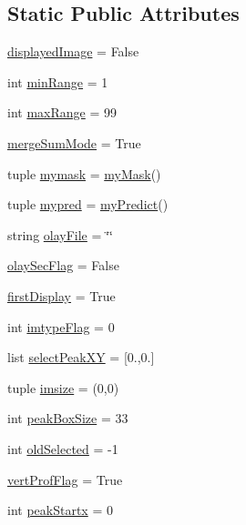 \subsection*{Static Public Attributes}
\begin{DoxyCompactItemize}
\item 
\hyperlink{class_atrex_1_1_atrex_adb81a9472392a89ed733d7d0779e45b7}{displayed\-Image} = False
\item 
int \hyperlink{class_atrex_1_1_atrex_ae832c8b0566a3106d3021b88ea739683}{min\-Range} = 1
\item 
int \hyperlink{class_atrex_1_1_atrex_ad050fe0947cfc2aaed121ca1f306d637}{max\-Range} = 99
\item 
\hyperlink{class_atrex_1_1_atrex_a68605f5249c1a23ea96180aa7c011acd}{merge\-Sum\-Mode} = True
\item 
tuple \hyperlink{class_atrex_1_1_atrex_af008dc7c13f040fea0e0bd315badd461}{mymask} = \hyperlink{classmy_mask_1_1my_mask}{my\-Mask}()
\item 
tuple \hyperlink{class_atrex_1_1_atrex_af1384190082613188d50f79e7dacb4d4}{mypred} = \hyperlink{classmy_predict_1_1my_predict}{my\-Predict}()
\item 
string \hyperlink{class_atrex_1_1_atrex_a6c119a7ed751e933a34e165078520474}{olay\-File} = \char`\"{}\char`\"{}
\item 
\hyperlink{class_atrex_1_1_atrex_a2ae7c7ded99e983cf654f68a09974198}{olay\-Sec\-Flag} = False
\item 
\hyperlink{class_atrex_1_1_atrex_a227e61447cc5900a7a818713fffb4d9e}{first\-Display} = True
\item 
int \hyperlink{class_atrex_1_1_atrex_aabc4d80436aab113d3ecabc4fb692c8e}{imtype\-Flag} = 0
\item 
list \hyperlink{class_atrex_1_1_atrex_aec9ff4f8500b49c9d93872db1a458c5e}{select\-Peak\-X\-Y} = \mbox{[}0.,0.\mbox{]}
\item 
tuple \hyperlink{class_atrex_1_1_atrex_ab1b2d6a17f54b2f004daea4b71512152}{imsize} = (0,0)
\item 
int \hyperlink{class_atrex_1_1_atrex_a6d1d3398ca810ec9843f350350736793}{peak\-Box\-Size} = 33
\item 
int \hyperlink{class_atrex_1_1_atrex_ad74b4f1510f5797e76342de65eaf8433}{old\-Selected} = -\/1
\item 
\hyperlink{class_atrex_1_1_atrex_a4ca8a779dc0d0c890538d52bf28dd7da}{vert\-Prof\-Flag} = True
\item 
int \hyperlink{class_atrex_1_1_atrex_a8131137cca435bd72d5a9080f758c0ae}{peak\-Startx} = 0

\end{DoxyCompactItemize}
